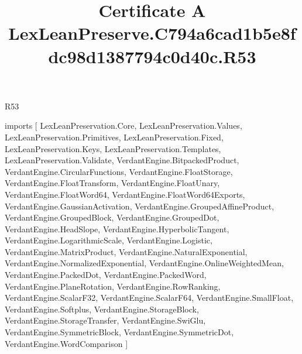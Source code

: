 \begin{lexlean}{R53}
\title{Certificate A LexLeanPreserve.C794a6cad1b5e8fdc98d1387794c0d40c.R53}
\begin{coremodule}
imports [
  LexLeanPreservation.Core,
  LexLeanPreservation.Values,
  LexLeanPreservation.Primitives,
  LexLeanPreservation.Fixed,
  LexLeanPreservation.Keys,
  LexLeanPreservation.Templates,
  LexLeanPreservation.Validate,
  VerdantEngine.BitpackedProduct,
  VerdantEngine.CircularFunctions,
  VerdantEngine.FloatStorage,
  VerdantEngine.FloatTransform,
  VerdantEngine.FloatUnary,
  VerdantEngine.FloatWord64,
  VerdantEngine.FloatWord64Exports,
  VerdantEngine.GaussianActivation,
  VerdantEngine.GroupedAffineProduct,
  VerdantEngine.GroupedBlock,
  VerdantEngine.GroupedDot,
  VerdantEngine.HeadSlope,
  VerdantEngine.HyperbolicTangent,
  VerdantEngine.LogarithmicScale,
  VerdantEngine.Logistic,
  VerdantEngine.MatrixProduct,
  VerdantEngine.NaturalExponential,
  VerdantEngine.NormalizedExponential,
  VerdantEngine.OnlineWeightedMean,
  VerdantEngine.PackedDot,
  VerdantEngine.PackedWord,
  VerdantEngine.PlaneRotation,
  VerdantEngine.RowRanking,
  VerdantEngine.ScalarF32,
  VerdantEngine.ScalarF64,
  VerdantEngine.SmallFloat,
  VerdantEngine.Softplus,
  VerdantEngine.StorageBlock,
  VerdantEngine.StorageTransfer,
  VerdantEngine.SwiGlu,
  VerdantEngine.SymmetricBlock,
  VerdantEngine.SymmetricDot,
  VerdantEngine.WordComparison
]


\end{coremodule}
\end{lexlean}
